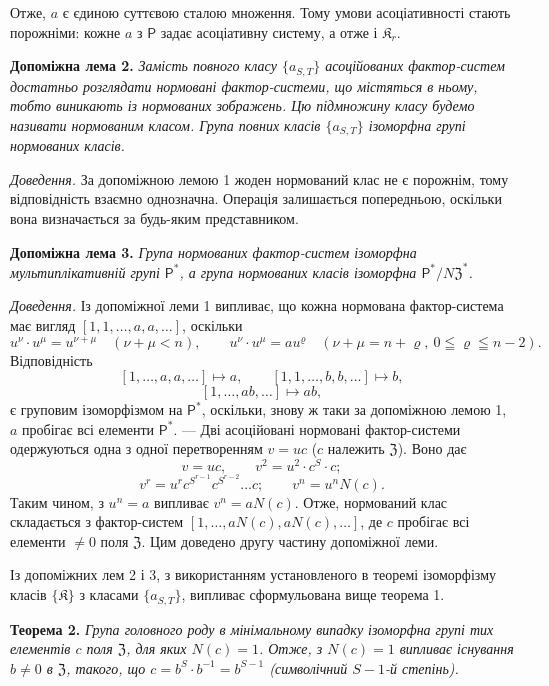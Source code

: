 \documentclass[11pt]{article}
\begin{document}
Отже, \(a\) є єдиною суттєвою сталою множення. Тому умови асоціативності стають порожніми: кожне \(a\) з \(\mathsf{P}\) задає асоціативну систему, а отже і \(\mathfrak K_r\).

\noindent\textbf{Допоміжна лема 2.} \emph{Замість повного класу \(\{a_{S,T}\}\) асоційованих фактор-систем достатньо розглядати нормовані фактор-системи, що містяться в ньому, тобто виникають із нормованих зображень. Цю підмножину класу будемо називати нормованим класом. Група повних класів \(\{a_{S,T}\}\) ізоморфна групі нормованих класів.}

\noindent\emph{Доведення.} За допоміжною лемою 1 жоден нормований клас не є порожнім, тому відповідність взаємно однозначна. Операція залишається попередньою, оскільки вона визначається за будь-яким представником.

\noindent\textbf{Допоміжна лема 3.} \emph{Група нормованих фактор-систем ізоморфна мультиплікативній групі \(\mathsf{P}^*\), а група нормованих класів ізоморфна \(\mathsf{P}^*/N\mathfrak Z^*\).}

\noindent\emph{Доведення.} Із допоміжної леми 1 випливає, що кожна нормована фактор-система має вигляд \([1,1,\ldots,a,a,\ldots]\), оскільки
\[
u^\nu\cdot u^\mu=u^{\nu+\mu}\quad(\nu+\mu<n),
\qquad
u^\nu\cdot u^\mu=au^\varrho\quad(\nu+\mu=n+\varrho,\ 0\leqq\varrho\leqq n-2).
\]
Відповідність
\[
[1,\ldots,a,a,\ldots]\mapsto a,
\qquad
[1,1,\ldots,b,b,\ldots]\mapsto b,
\]
\[
[1,\ldots,ab,\ldots]\mapsto ab,
\]
є груповим ізоморфізмом на \(\mathsf{P}^*\), оскільки, знову ж таки за допоміжною лемою 1, \(a\) пробігає всі елементи \(\mathsf{P}^*\). --- Дві асоційовані нормовані фактор-системи одержуються одна з одної перетворенням \(v=uc\) (\(c\) належить \(\mathfrak Z\)). Воно дає
\[
v=uc,\qquad v^2=u^2\cdot c^S\cdot c;
\]
\[
v^r=u^r c^{S^{r-1}}c^{S^{r-2}}\ldots c;
\qquad
v^n=u^nN(c).
\]
Таким чином, з \(u^n=a\) випливає \(v^n=aN(c)\). Отже, нормований клас складається з фактор-систем \([1,\ldots,aN(c),aN(c),\ldots]\), де \(c\) пробігає всі елементи \(\neq0\) поля \(\mathfrak Z\). Цим доведено другу частину допоміжної леми.

Із допоміжних лем 2 і 3, з використанням установленого в теоремі ізоморфізму класів \(\{\mathfrak K\}\) з класами \(\{a_{S,T}\}\), випливає сформульована вище теорема 1.

\noindent\textbf{Теорема 2.} \emph{Група головного роду в мінімальному випадку ізоморфна групі тих елементів \(c\) поля \(\mathfrak Z\), для яких \(N(c)=1\). Отже, з \(N(c)=1\) випливає існування \(b\neq0\) в \(\mathfrak Z\), такого, що \(c=b^S\cdot b^{-1}=b^{S-1}\) (символічний \(S-1\)-й степінь).}
\end{document}
